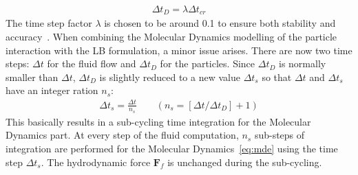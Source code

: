\begin{align}
\Delta \mathit{t}_{D}=\lambda \Delta \mathit{t}_{cr}
\end{align}
The time step factor $\lambda$ is chosen to be around 0.1 to ensure both stability and accuracy~\citep{He1997}. When combining the Molecular Dynamics modelling of the particle interaction with the LB formulation, a minor issue arises. There are now two time steps: $\Delta t$ for the fluid flow and $\Delta t_{D}$ for the particles. Since $\Delta t_{D}$ is normally smaller than $\Delta t$, $\Delta t_{D}$ is slightly reduced to a new value $\Delta t_{s}$ so that $\Delta t$ and $\Delta t_{s}$ have an integer ration $\mathit{n}_{\mathit{s}}$:
\begin{align}
\Delta t_{s}=\frac{\Delta t}{\mathit{n}_{s}} \qquad(\mathit{n}_{s}=[\Delta t/ \Delta t_{D}]+1)
\end{align} 
This basically results in a sub-cycling time integration for the Molecular Dynamics part. At every step of the fluid computation, $\mathit{n}_{s}$ sub-steps of integration are performed for the Molecular Dynamics~\eqref{eq:mde} using the time step $\Delta t_{s}$. The hydrodynamic force $\mathbf{F}_{f}$ is unchanged during the sub-cycling. 
